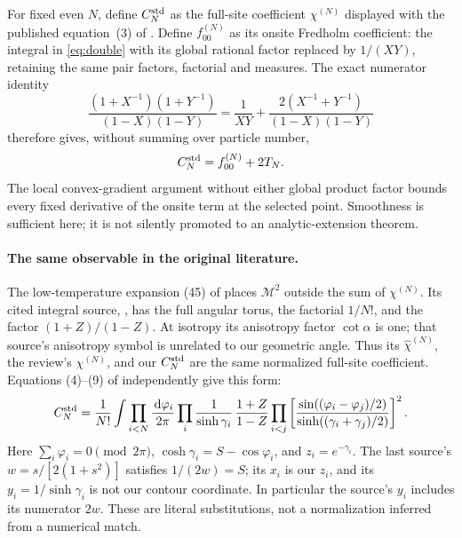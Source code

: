 \documentclass[11pt]{article}
\numberwithin{equation}{section}
\theoremstyle{definition}
\newcommand{\dd}{\,\mathrm d}
\newcommand{\M}{\mathcal M}
\begin{document}
For fixed even \(N\), define \(C_N^{\rm std}\) as the full-site
coefficient \(\chi^{(N)}\) displayed with the published equation~(3)
of \cite{TW2014}. Define \(f_{00}^{(N)}\) as its onsite Fredholm
coefficient: the integral in \eqref{eq:double} with its global rational
factor replaced by \(1/(XY)\), retaining the same pair factors,
factorial and measures. The exact numerator identity
\[
 \frac{(1+X^{-1})(1+Y^{-1})}{(1-X)(1-Y)}
 =\frac1{XY}+\frac{2(X^{-1}+Y^{-1})}{(1-X)(1-Y)}
\]
therefore gives, without summing over particle number,
\[
 C_N^{\rm std}=f_{00}^{(N)}+2T_N.
\]
The local convex-gradient argument without either global product
factor bounds every fixed derivative of the onsite term at the
selected point. Smoothness is sufficient here; it is not silently
promoted to an analytic-extension theorem.

\paragraph{The same observable in the original literature.}
The low-temperature expansion (45) of \cite{McCoyMaillard2012}
places \(\M^2\) outside the sum of \(\chi^{(N)}\).
Its cited integral source, \cite[(1.10), (3.13), (3.17)--(3.20)]{Orrick2001},
has the full angular torus, the factorial \(1/N!\), and the factor
\((1+Z)/(1-Z)\). At isotropy its anisotropy factor \(\cot\alpha\)
is one; that source's anisotropy symbol is unrelated to our geometric
angle. Thus its \(\widehat\chi^{(N)}\), the review's \(\chi^{(N)}\),
and our \(C_N^{\rm std}\) are the same normalized full-site coefficient.
Equations (4)--(9) of \cite{Boukraa2008} independently give this form:
\[
 C_N^{\rm std}=\frac1{N!}
 \int\prod_{i<N}\frac{\dd\varphi_i}{2\pi}
 \prod_i\frac1{\sinh\gamma_i}\,
 \frac{1+Z}{1-Z}
 \prod_{i<j}\left[
  \frac{\sin((\varphi_i-\varphi_j)/2)}
       {\sinh((\gamma_i+\gamma_j)/2)}
             \right]^2 .
\]
Here \(\sum_i\varphi_i=0\pmod{2\pi}\),
\(\cosh\gamma_i=S-\cos\varphi_i\), and \(z_i=e^{-\gamma_i}\).
The last source's \(w=s/[2(1+s^2)]\) satisfies \(1/(2w)=S\);
its \(x_i\) is our \(z_i\), and its \(y_i=1/\sinh\gamma_i\)
is not our contour coordinate. In particular the source's \(y_i\)
includes its numerator \(2w\). These are literal substitutions,
not a normalization inferred from a numerical match.
\end{document}
